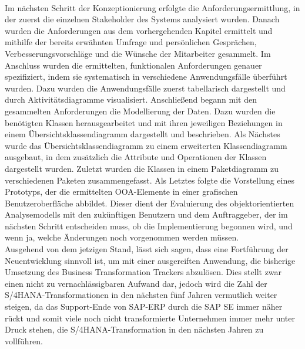 \\Im nächsten Schritt der Konzeptionierung erfolgte die Anforderungsermittlung, in der zuerst die einzelnen Stakeholder des Systems analysiert wurden. Danach wurden die Anforderungen aus dem vorhergehenden Kapitel ermittelt und mithilfe der bereits erwähnten Umfrage und persönlichen Gesprächen, Verbesserungsvorschläge und die Wünsche der Mitarbeiter gesammelt. Im Anschluss wurden die ermittelten, funktionalen Anforderungen genauer spezifiziert, indem sie systematisch in verschiedene Anwendungsfälle überführt wurden. Dazu wurden die Anwendungsfälle zuerst tabellarisch dargestellt und durch Aktivitätsdiagramme visualisiert. Anschließend begann mit den gesammelten Anforderungen die Modellierung der Daten. Dazu wurden die benötigten Klassen herausgearbeitet und mit ihren jeweiligen Beziehungen in einem Übersichtsklassendiagramm dargestellt und beschrieben. Als Nächstes wurde das Übersichtsklassendiagramm zu einem erweiterten Klassendiagramm ausgebaut, in dem zusätzlich die Attribute und Operationen der Klassen dargestellt wurden. Zuletzt wurden die Klassen in einem Paketdiagramm zu verschiedenen Paketen zusammengefasst.
Als Letztes folgte die Vorstellung eines Prototyps, der die ermittelten OOA-Elemente in einer grafischen Benutzeroberfläche abbildet. Dieser dient der Evaluierung des objektorientierten Analysemodells mit den zukünftigen Benutzern und dem Auftraggeber, der im nächsten Schritt entscheiden muss, ob die Implementierung begonnen wird, und wenn ja, welche Änderungen noch vorgenommen werden müssen.\\
Ausgehend von dem jetzigen Stand, lässt sich sagen, dass eine Fortführung der Neuentwicklung sinnvoll ist, um mit einer ausgereiften Anwendung, die bisherige Umsetzung des Business Transformation Trackers abzulösen. Dies stellt zwar einen nicht zu vernachlässigbaren Aufwand dar, jedoch wird die Zahl der S/4HANA-Transformationen in den nächsten fünf Jahren vermutlich weiter steigen, da das Support-Ende von SAP-ERP durch die SAP SE immer näher rückt und somit viele noch nicht transformierte Unternehmen immer mehr unter Druck stehen, die S/4HANA-Transformation in den nächsten Jahren zu vollführen.